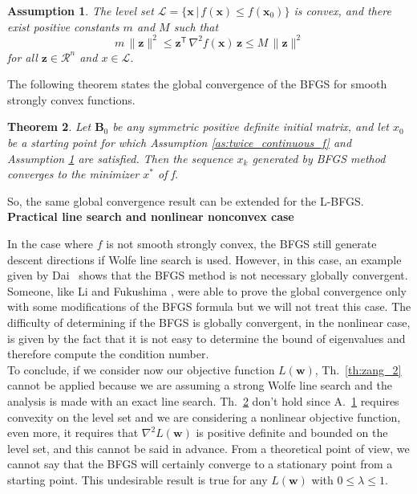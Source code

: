 \documentclass[11pt]{article}
\newtheorem{theorem}{Theorem}[section]
\newtheorem{assumption}[theorem]{Assumption}
\begin{document}
\begin{assumption}
\label{as:symetric_hessian}
The level set $\mathcal{L} = \{ \mathbf{x}\, | \, f(\mathbf{x}) \leq f(\mathbf{x}_0)\}$ is convex, and there exist positive constants $m$ and $M$ such that
\begin{equation*}
    m \, \| \mathbf{z} \|^2 \leq \mathbf{z}^\mathsf{T} \, \nabla^2 f(\mathbf{x}) \, \mathbf{z} \leq M \, \| \mathbf{z} \|^2
\end{equation*}
for all $\mathbf{z} \in \mathcal{R}^n$ and $x \in \mathcal{L}$.
\end{assumption}

The following theorem states the global convergence of the BFGS for smooth strongly convex functions.

\begin{theorem}
\label{th:global_convergence_bfgs}
Let $\mathbf{B}_0$ be any symmetric positive definite initial matrix, and let $x_0$ be a starting point for which Assumption \ref{as:twice_continuous_f} and Assumption \ref{as:symetric_hessian} are satisfied. Then the sequence ${x_k}$ generated by BFGS method converges to the minimizer $x^*$ of f.
\end{theorem}

So, the same global convergence result can be extended for the L-BFGS.\\

\textbf{Practical line search and nonlinear nonconvex case}

In the case where $f$ is not smooth strongly convex, the BFGS still generate descent directions if Wolfe line search is used. However, in this case, an example given by Dai~\cite{dai_bfgs_controes} shows that the BFGS method is not necessary globally convergent. Someone, like Li and Fukushima \cite{Fukushima}, were able to prove the global convergence only with some modifications of the BFGS formula but we will not treat this case. The difficulty of determining if the BFGS is globally convergent, in the nonlinear case, is given by the fact that it is not easy to determine the bound of eigenvalues and therefore compute the condition number.\\ 


\noindent To conclude, if we consider now our objective function $L(\mathbf{w})$, Th.~\ref{th:zang_2} cannot be applied because we are assuming a strong Wolfe line search and the analysis is made with an exact line search. Th.~\ref{th:global_convergence_bfgs} don't hold since A.~\ref{as:symetric_hessian} requires convexity on the level set and we are considering a nonlinear objective function, even more, it requires that $\nabla^2 L(\mathbf{w})$ is positive definite and bounded on the level set, and this cannot be said in advance. From a theoretical point of view, we cannot say that the BFGS will certainly converge to a stationary point from a starting point. This undesirable result is true for any $L(\mathbf{w})$ with $0\leq \lambda \leq 1$.
\end{document}
